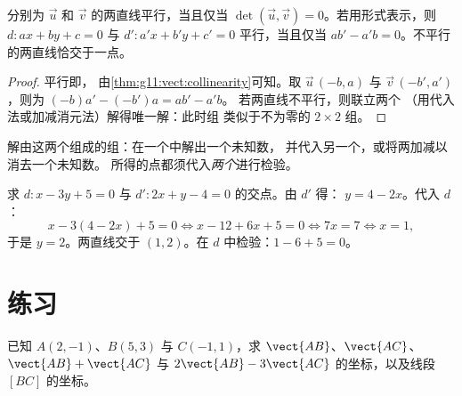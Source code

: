 \begin{proposition}[平行或相交]\label{prop:g11:vect:positions}
分别为 $\vec u$ 和 $\vec v$ 的两直线平行，当且仅当
$\det(\vec u, \vec v) = 0$。若用形式表示，则 $d : ax + by + c =
0$ 与 $d' : a'x + b'y + c' = 0$ 平行，当且仅当
$ab' - a'b = 0$。不平行的两直线恰交于一点。
\end{proposition}

\begin{proof}
平行即，
由\cref{thm:g11:vect:collinearity}可知。取 $\vec u\,(-b, a)$ 与
$\vec v\,(-b', a')$，则为 $(-b)a' - (-b')a = ab' - a'b$。
若两直线不平行，则联立两个
（用代入法或加减消元法）解得唯一解：此时组
类似于不为零的 $2 \times 2$ 组。
\end{proof}

\begin{method}[两直线的交点]\label{met:g11:vect:intersection}
解由这两个组成的组：在一个中解出一个未知数，
并代入另一个，或将两加减以消去一个未知数。
所得的点都须代入\emph{两个}进行检验。
\end{method}

\begin{example}\label{ex:g11:vect:intersection}
求 $d: x - 3y + 5 = 0$ 与 $d': 2x + y - 4 = 0$ 的交点。由 $d'$ 得：
$y = 4 - 2x$。代入 $d$：
\[
x - 3(4 - 2x) + 5 = 0
\iff x - 12 + 6x + 5 = 0
\iff 7x = 7
\iff x = 1,
\]
于是 $y = 2$。两直线交于 $(1, 2)$。在 $d$ 中检验：$1 - 6 + 5 = 0$。
\end{example}

\section{练习}

\begin{exercise}[$\star$]\label{exo:g11:vect:1}
已知 $A(2, -1)$、$B(5, 3)$ 与 $C(-1, 1)$，求
$\vect{AB}$、$\vect{AC}$、$\vect{AB} + \vect{AC}$ 与 $2\vect{AB} -
3\vect{AC}$ 的坐标，以及线段 $[BC]$ 的坐标。
\end{exercise}

